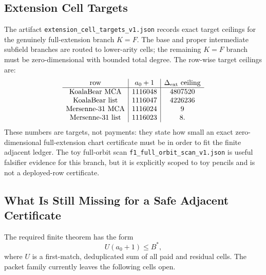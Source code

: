 \subsection{Extension Cell Targets}

The artifact \texttt{extension\_cell\_targets\_v1.json} records exact target
ceilings for the genuinely full-extension branch \(K=F\).  The base and
proper intermediate subfield branches are routed to lower-arity cells; the
remaining \(K=F\) branch must be zero-dimensional with bounded total degree.
The row-wise target ceilings are:
\[
\begin{array}{c|c|c}
\text{row} & a_0+1 & \Delta_{\rm ext}\text{ ceiling}\\ \hline
\text{KoalaBear MCA} & 1116048 & 4807520\\
\text{KoalaBear list} & 1116047 & 4226236\\
\text{Mersenne-31 MCA} & 1116024 & 9\\
\text{Mersenne-31 list} & 1116023 & 8.
\end{array}
\]
These numbers are targets, not payments: they state how small an exact
zero-dimensional full-extension chart certificate must be in order to fit the
finite adjacent ledger.  The toy full-orbit scan
\texttt{f1\_full\_orbit\_scan\_v1.json} is useful falsifier evidence for this
branch, but it is explicitly scoped to toy pencils and is not a deployed-row
certificate.

\subsection{What Is Still Missing for a Safe Adjacent Certificate}

The required finite theorem has the form
\[
        U(a_0+1)\le B^*,
\]
where \(U\) is a first-match, deduplicated sum of all paid and residual cells.
The packet family currently leaves the following cells open.

